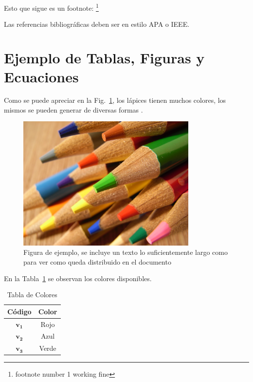 Esto que sigue es un footnote: \footnote{footnote number 1 working fine}

Las referencias bibliográficas deben ser en estilo APA o IEEE. 

\section{Ejemplo de Tablas, Figuras y Ecuaciones}

Como se puede apreciar en la Fig.~\ref{fig2_intro}, los lápices tienen muchos colores, los mismos se pueden generar de diversas formas \cite{ejemplo}.

\begin{figure}[htb]
	\centering
	\includegraphics[width=0.8\textwidth]{figs/chapter1/sample.jpg} %
	\caption[Figura de ejemplo]{Figura de ejemplo, se incluye un texto lo suficientemente largo como para ver como queda distribuido en el documento}	%
	\label{fig2_intro}
\end{figure}

En la Tabla~\ref{table1_intro} se observan los colores disponibles.
\begin{table}[htb]
\renewcommand{\arraystretch}{1.3}
	\caption[Colores]{Tabla de Colores} %
	\label{table1_intro}
	\centering
	\setlength\tabcolsep{2pt}
	\begin{tabular}{c c}
		\hline
		\bfseries Código & \bfseries Color\\
		\hline
		$\mathbf{v_1}$ & Rojo\\
		$\mathbf{v_2}$ & Azul\\
		$\mathbf{v_3}$ & Verde\\
		\hline
	\end{tabular}
\end{table}

